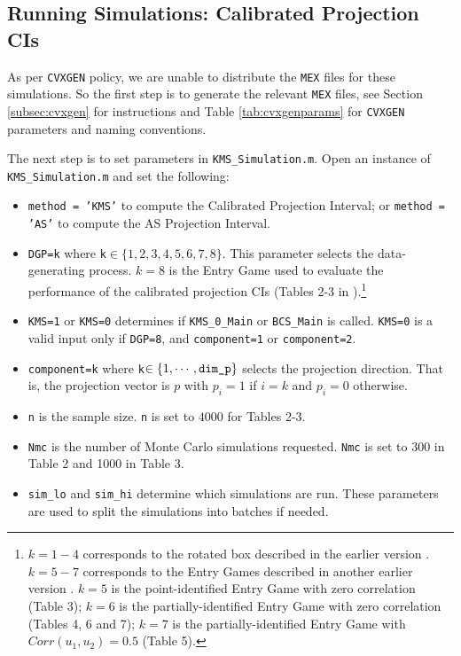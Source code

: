 \documentclass[12pt]{article}
\def\code#1{\texttt{#1}}
\begin{document}
\subsection{Running Simulations: Calibrated Projection CIs}\label{sec:simulations}
As per \code{CVXGEN} policy, we are unable to distribute the \code{MEX} files for these simulations.  So the first step is to generate the relevant \code{MEX} files, see Section \ref{subsec:cvxgen} for instructions and Table \ref{tab:cvxgenparams} for \code{CVXGEN} parameters and naming conventions.

The next step is to set parameters in \code{KMS\_Simulation.m}.  Open an instance of \code{KMS\_Simul\-ation.m} and set the following:
\begin{itemize}
\item \code{method = 'KMS'} to compute the Calibrated Projection Interval; or \code{method = 'AS'} to compute the AS Projection Interval.
\item \code{DGP=k} where \code{k}$\in \{1,2,3,4,5,6,7,8\}$. This parameter selects the data-generating process.  $k=8$ is the Entry Game used to evaluate the performance of the calibrated projection CIs (Tables 2-3 in ).\footnote{$k=1-4$ corresponds to the rotated box described in the earlier version . $k=5-7$ corresponds to the Entry Games described in another earlier version \cite{kaido2017confidence}. $k=5$ is the point-identified Entry Game with zero correlation (Table 3); $k=6$ is the partially-identified Entry Game with zero correlation (Tables 4, 6 and 7); $k=7$ is the partially-identified Entry Game with $Corr(u_1,u_2) = 0.5$ (Table 5).}   
\item \code{KMS=1} or \code{KMS=0} determines if \code{KMS\_0\_Main} or \code{BCS\_Main} is called. \code{KMS=0} is a valid input only if \code{DGP=8}, and  \code{component=1} or \code{component=2}.
\item \code{component=k} where \code{k}$\in \{1,\cdots,\text{\code{dim\_p}}\}$ selects the projection direction.  That is, the projection vector is $p$ with $p_i = 1$ if $i=k$ and $p_i = 0$ otherwise.
\item \code{n} is the sample size.  \code{n} is set to $4000$ for Tables 2-3.
\item \code{Nmc} is the number of Monte Carlo simulations requested.  \code{Nmc} is set to 300 in Table 2 and 1000 in Table 3.
\item \code{sim\_lo} and \code{sim\_hi} determine which simulations are run.  These parameters are used to split the simulations into batches if needed.
\end{itemize}
\end{document}
